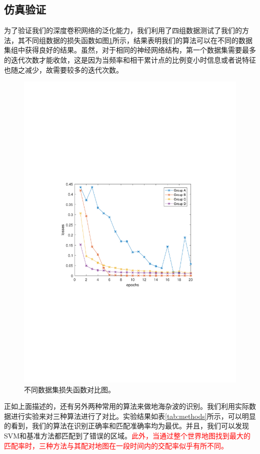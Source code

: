 \subsection{仿真验证}
为了验证我们的深度卷积网络的泛化能力，我们利用了四组数据测试了我们的方法，其不同组数据的损失函数如图\ref{fig:group_results}所示，结果表明我们的算法可以在不同的数据集组中获得良好的结果。虽然，对于相同的神经网络结构，第一个数据集需要最多的迭代次数才能收敛，这是因为当频率和相干累计点的比例变小时信息或者说特征也随之减少，故需要较多的迭代次数。
\begin{figure}[!t]
	\centering
	\includegraphics[width=\textwidth]{figures/group_results}
	\caption{不同数据集损失函数对比图。}
	\label{fig:group_results}
\end{figure}
正如上面描述的，还有另外两种常用的算法来做地海杂波的识别。我们利用实际数据进行实验来对三种算法进行了对比。实验结果如表\ref{tab:methods}所示，可以明显的看到，我们的算法在识别正确率和匹配准确率均为最优。并且，我们可以发现SVM和基准方法都匹配到了错误的区域。\textcolor{red}{此外，当通过整个世界地图找到最大的匹配率时，三种方法与其配对地图在一段时间内的交配率似乎有所不同。}

